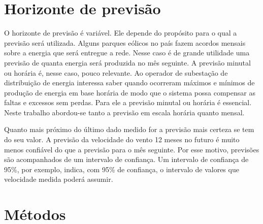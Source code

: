 \documentclass[
	12pt,				%
	openright,			%
	oneside,			%
	a4paper,			%
	english,			%
	french,				%
	spanish,			%
	brazil				%
	]{abntex2}
\begin{document}
\section{Horizonte de previsão}

O horizonte de previsão é variável. Ele depende do propósito para o qual a previsão será utilizada. Alguns parques eólicos no país fazem acordos mensais sobre a energia que será entregue a rede. Nesse caso é de grande utilidade uma previsão de quanta energia será produzida no mês seguinte. A previsão minutal ou horária é, nesse caso, pouco relevante.
Ao operador de subestação de distribuição de energia interessa saber quando ocorreram máximos e mínimos de produção de energia em base horária de modo que o sistema possa compensar as faltas e excessos sem perdas. Para ele a previsão minutal ou horária é essencial. Neste trabalho abordou-se tanto a previsão em escala horária quanto mensal.

Quanto mais próximo do último dado medido for a previsão mais certeza se tem do seu valor. A previsão da velocidade do vento 12 meses no futuro é muito menos confiável do que a previsão para o mês seguinte. Por esse motivo, previsões são acompanhados de um intervalo de confiança. Um intervalo de confiança de 95\%, por exemplo, indica, com 95\% de confiança, o intervalo de valores que velocidade medida poderá assumir.


\section{Métodos}
\end{document}
